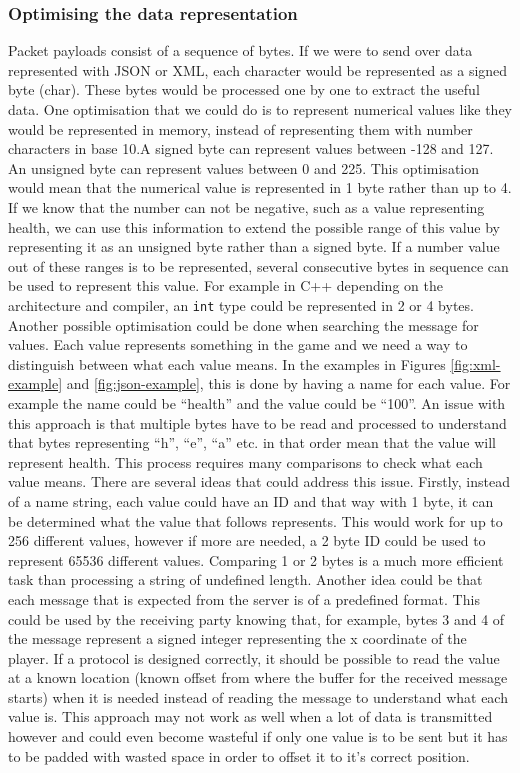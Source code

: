 \subsubsection{Optimising the data representation}
Packet payloads consist of a sequence of bytes. If we were to send over data represented with JSON or XML, each character would be represented as a signed byte (char). These bytes would be processed one by one to extract the useful data. One optimisation that we could do is to represent numerical values like they would be represented in memory, instead of representing them with number characters in base 10.A signed byte can represent values between -128 and 127. An unsigned byte can represent values between 0 and 225. This optimisation would mean that the numerical value is represented in 1 byte rather than up to 4. If we know that the number can not be negative, such as a value representing health, we can use this information to extend the possible range of this value by representing it as an unsigned byte rather than a signed byte. If a number value out of these ranges is to be represented, several consecutive bytes in sequence can be used to represent this value. For example in C++ depending on the architecture and compiler, an \lstinline{int} type could be represented in 2 or 4 bytes.
Another possible optimisation could be done when searching the message for values. Each value represents something in the game and we need a way to distinguish between what each value means. In the examples in Figures \ref{fig:xml-example} and \ref{fig:json-example}, this is done by having a name for each value. For example the name could be ``health'' and the value could be ``100''. An issue with this approach is that multiple bytes have to be read and processed to understand that bytes representing ``h'', ``e'', ``a'' etc. in that order mean that the value will represent health. This process requires many comparisons to check what each value means. There are several ideas that could address this issue. Firstly, instead of a name string, each value could have an ID and that way with 1 byte, it can be determined what the value that follows represents. This would work for up to 256 different values, however if more are needed, a 2 byte ID could be used to represent 65536 different values. Comparing 1 or 2 bytes is a much more efficient task than processing a string of undefined length. Another idea could be that each message that is expected from the server is of a predefined format. This could be used by the receiving party knowing that, for example, bytes 3 and 4 of the message represent a signed integer representing the x coordinate of the player. If a protocol is designed correctly, it should be possible to read the value at a known location (known offset from where the buffer for the received message starts) when it is needed instead of reading the message to understand what each value is. This approach may not work as well when a lot of data is transmitted however and could even become wasteful if only one value is to be sent but it has to be padded with wasted space in order to offset it to it's correct position.


